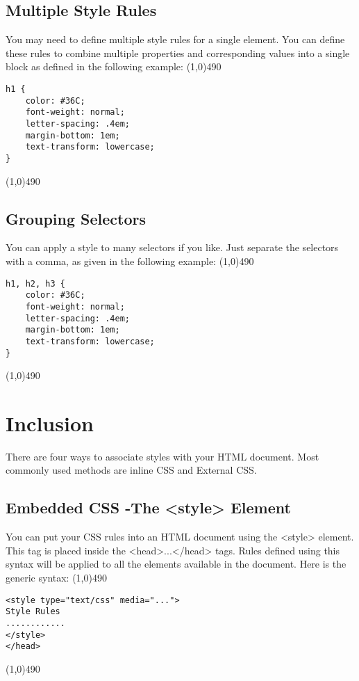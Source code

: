 \documentclass{report}
\begin{document}
    \subsection{Multiple Style Rules}
    \bigbreak \noindent 
    You may need to define multiple style rules for a single element. You can define
    these rules to combine multiple properties and corresponding values into a
    single block as defined in the following example:
    \bigbreak \noindent 
    \line(1,0){490}
    \begin{verbatim}
h1 {
    color: #36C;
    font-weight: normal;
    letter-spacing: .4em;
    margin-bottom: 1em;
    text-transform: lowercase;
}
    \end{verbatim}
    \line(1,0){490}

    \pagebreak \bigbreak \noindent 
    \subsection{Grouping Selectors}
    \bigbreak \noindent 
    You can apply a style to many selectors if you like. Just separate the selectors
    with a comma, as given in the following example:
    \bigbreak \noindent 
    \line(1,0){490}
    \begin{verbatim}
h1, h2, h3 {
    color: #36C;
    font-weight: normal;
    letter-spacing: .4em;
    margin-bottom: 1em;
    text-transform: lowercase;
}
    \end{verbatim}
    \line(1,0){490}

    \pagebreak \bigbreak \noindent 
    \section{\LARGE Inclusion }
    \bigbreak \noindent 
    There are four ways to associate styles with your HTML document. Most commonly used methods are inline CSS and External CSS.

    \bigbreak \noindent 
    \subsection{Embedded CSS -The <style> Element}
    \bigbreak \noindent 
    You can put your CSS rules into an HTML document using the <style> element.
This tag is placed inside the <head>...</head> tags. Rules defined using this
syntax will be applied to all the elements available in the document. Here is the
generic syntax:
\bigbreak \noindent 
\line(1,0){490}
\begin{verbatim}
<style type="text/css" media="...">
Style Rules
............
</style>
</head>
\end{verbatim}
\line(1,0){490}
\end{document}
